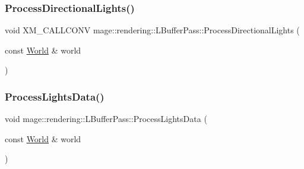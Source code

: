 \hypertarget{classmage_1_1rendering_1_1_l_buffer_pass_a97047b8acf6e4e552ab8f7b7ec08b1be}{}\label{classmage_1_1rendering_1_1_l_buffer_pass_a97047b8acf6e4e552ab8f7b7ec08b1be} 
\subsubsection{\texorpdfstring{Process\+Directional\+Lights()}{ProcessDirectionalLights()}}
{\footnotesize\ttfamily void X\+M\+\_\+\+C\+A\+L\+L\+C\+O\+NV mage\+::rendering\+::\+L\+Buffer\+Pass\+::\+Process\+Directional\+Lights (\begin{DoxyParamCaption}\item[{const \hyperlink{classmage_1_1rendering_1_1_world}{World} \&}]{world }\end{DoxyParamCaption})\hspace{0.3cm}{\ttfamily [private]}}

\hypertarget{classmage_1_1rendering_1_1_l_buffer_pass_a1ec1d116e0b9ec1066faa7a2b3db5ca5}{}\label{classmage_1_1rendering_1_1_l_buffer_pass_a1ec1d116e0b9ec1066faa7a2b3db5ca5} 
\subsubsection{\texorpdfstring{Process\+Lights\+Data()}{ProcessLightsData()}}
{\footnotesize\ttfamily void mage\+::rendering\+::\+L\+Buffer\+Pass\+::\+Process\+Lights\+Data (\begin{DoxyParamCaption}\item[{const \hyperlink{classmage_1_1rendering_1_1_world}{World} \&}]{world }\end{DoxyParamCaption})\hspace{0.3cm}{\ttfamily [private]}}

\hypertarget{classmage_1_1rendering_1_1_l_buffer_pass_af9e7e859505ec7ee16155f4e11d98a67}{}\label{classmage_1_1rendering_1_1_l_buffer_pass_af9e7e859505ec7ee16155f4e11d98a67} 
